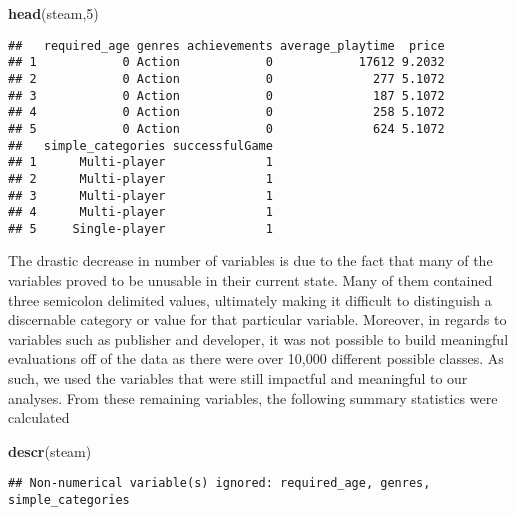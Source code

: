\documentclass[]{article}
\newenvironment{Shaded}{\begin{snugshade}}{\end{snugshade}}
\newcommand{\DecValTok}[1]{\textcolor[rgb]{0.00,0.00,0.81}{#1}}
\newcommand{\KeywordTok}[1]{\textcolor[rgb]{0.13,0.29,0.53}{\textbf{#1}}}
\newcommand{\NormalTok}[1]{#1}
\begin{document}
\begin{Shaded}
\begin{Highlighting}[]
\KeywordTok{head}\NormalTok{(steam,}\DecValTok{5}\NormalTok{)}
\end{Highlighting}
\end{Shaded}

\begin{verbatim}
##   required_age genres achievements average_playtime  price
## 1            0 Action            0            17612 9.2032
## 2            0 Action            0              277 5.1072
## 3            0 Action            0              187 5.1072
## 4            0 Action            0              258 5.1072
## 5            0 Action            0              624 5.1072
##   simple_categories successfulGame
## 1      Multi-player              1
## 2      Multi-player              1
## 3      Multi-player              1
## 4      Multi-player              1
## 5     Single-player              1
\end{verbatim}

The drastic decrease in number of variables is due to the fact that many
of the variables proved to be unusable in their current state. Many of
them contained three semicolon delimited values, ultimately making it
difficult to distinguish a discernable category or value for that
particular variable. Moreover, in regards to variables such as publisher
and developer, it was not possible to build meaningful evaluations off
of the data as there were over 10,000 different possible classes. As
such, we used the variables that were still impactful and meaningful to
our analyses. From these remaining variables, the following summary
statistics were calculated

\begin{Shaded}
\begin{Highlighting}[]
\KeywordTok{descr}\NormalTok{(steam)}
\end{Highlighting}
\end{Shaded}

\begin{verbatim}
## Non-numerical variable(s) ignored: required_age, genres, simple_categories
\end{verbatim}
\end{document}
